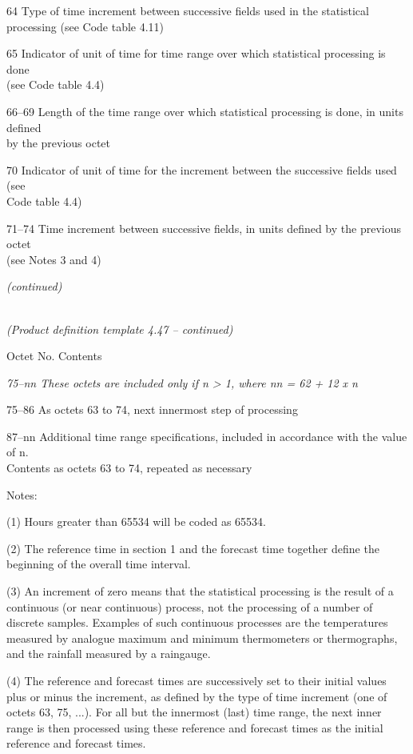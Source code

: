64 Type of time increment between successive fields used in the statistical\\
processing (see Code table 4.11)

65 Indicator of unit of time for time range over which statistical processing is done\\
(see Code table 4.4)

66--69 Length of the time range over which statistical processing is done, in units defined\\
by the previous octet

70 Indicator of unit of time for the increment between the successive fields used (see\\
Code table 4.4)

71--74 Time increment between successive fields, in units defined by the previous octet\\
(see Notes 3 and 4)

\emph{(continued)}

\emph{\\
(Product definition template 4.47 -- continued)}

Octet No. Contents

\emph{75--nn These octets are included only if n \textgreater{} 1, where nn = 62 + 12 x n}

75--86 As octets 63 to 74, next innermost step of processing

87--nn Additional time range specifications, included in accordance with the value of n.\\
Contents as octets 63 to 74, repeated as necessary

Notes:

(1) Hours greater than 65534 will be coded as 65534.

(2) The reference time in section 1 and the forecast time together define the beginning of the overall time interval.

(3) An increment of zero means that the statistical processing is the result of a continuous (or near continuous) process, not the processing of a number of discrete samples. Examples of such continuous processes are the temperatures measured by analogue maximum and minimum thermometers or thermographs, and the rainfall measured by a raingauge.

(4) The reference and forecast times are successively set to their initial values plus or minus the increment, as defined by the type of time increment (one of octets 63, 75, ...). For all but the innermost (last) time range, the next inner range is then processed using these reference and forecast times as the initial reference and forecast times.

